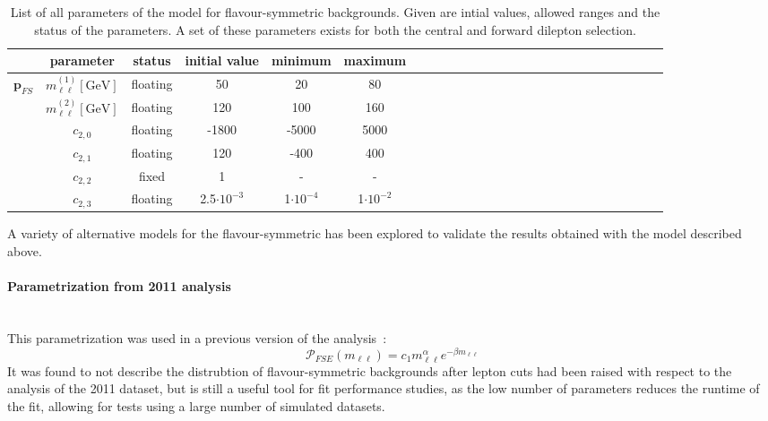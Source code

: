 \begin{table}[htbp]
\begin{center}
 \renewcommand{\arraystretch}{1.3}
 \caption{List of all parameters of the model for flavour-symmetric backgrounds. Given are intial values, allowed ranges and the status of the parameters. A set of these parameters exists for both the central and forward dilepton selection.\label{tab:Fit_Par_Overview_FS}}
\begin{tabular}{l|c|c|c|c|ccccccccccccccccccccc}
& parameter & status & initial value & minimum & maximum \\ \hline
\multirow{5}{*}{$\mathbf{p}_{FS}$} & $m_{\ell\ell}^{(1)} [\mathrm{GeV}]$ & floating & 50 & 20 & 80 \\ 
& $m_{\ell\ell}^{(2)}  [\mathrm{GeV}]$ & floating & 120 & 100 & 160 \\
& $c_{2,0}$ & floating & -1800 & -5000 & 5000 \\ 
& $c_{2,1}$ & floating & 120 & -400 & 400 \\
& $c_{2,2}$ & fixed & 1 & - & - \\
& $c_{2,3}$ & floating & 2.5$\cdot10^{-3}$ & 1$\cdot10^{-4}$ & 1$\cdot10^{-2}$ \\
\end{tabular}

\end{center}
\end{table}

A variety of alternative models for the flavour-symmetric has been explored to validate the results obtained with the model described above. 

\paragraph{Parametrization from 2011 analysis}\mbox{} \\
This parametrization was used in a previous version of the analysis~\cite{edge2011}: 
\begin{equation*}
 \mathcal{P}_{FSE}(m_{\ell\ell}) = c_{1} m_{\ell\ell}^{\alpha} e^{-\beta m_{\ell\ell}}
\end{equation*}
It was found to not describe the distrubtion of flavour-symmetric backgrounds after lepton \pt cuts had been raised with respect to the analysis of the 2011 dataset, but is still a useful tool for fit performance studies, as the low number of parameters reduces the runtime of the fit, allowing for tests using a large number of simulated datasets.
